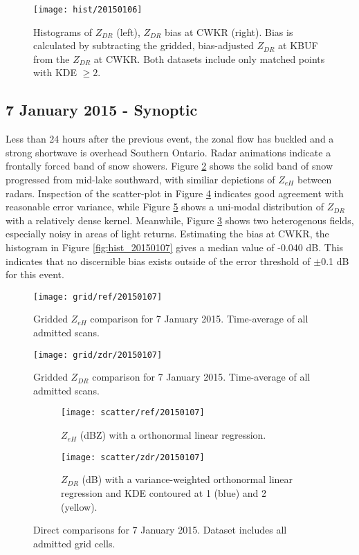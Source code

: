 \begin{figure}[H]
\texttt{[image: hist/20150106]}\centering
\caption{Histograms of $Z_{DR}$ (left), $Z_{DR}$ bias at CWKR (right). Bias is calculated by subtracting the gridded, bias-adjusted $Z_{DR}$ at KBUF from the
$Z_{DR}$ at CWKR. Both datasets include only matched points with KDE $\geq 2$.} 
\label{fig:hist_20150106}
\end{figure}

\subsection{7 January 2015 - Synoptic}
Less than 24 hours after the previous event, the zonal flow has buckled and a strong shortwave is overhead Southern Ontario. Radar animations indicate a
frontally forced band of snow showers. Figure \ref{fig:grid_ref_20150107} shows the solid band of snow progressed from mid-lake southward, with similiar
depictions of $Z_{eH}$ between radars. Inspection of the scatter-plot in Figure \ref{fig:scatter_ref_20150107} indicates good agreement with reasonable error
variance, while Figure \ref{fig:scatter_zdr_20150107} shows a uni-modal distribution of $Z_{DR}$ with a relatively dense kernel.
Meanwhile, Figure \ref{fig:grid_zdr_20150107} shows two heterogenous fields, especially noisy in areas of light returns. 
Estimating the bias at CWKR, the histogram in Figure \ref{fig:hist_20150107} gives a median value of -0.040 dB. This indicates that no discernible bias
exists outside of the error threshold of $\pm$0.1 dB for this event.

\begin{figure}[H]
\texttt{[image: grid/ref/20150107]}
\caption{Gridded $Z_{eH}$ comparison for 7 January 2015. Time-average of all admitted scans.} 
\label{fig:grid_ref_20150107}
\end{figure}

\begin{figure}[H]
\texttt{[image: grid/zdr/20150107]}
\caption{Gridded $Z_{DR}$ comparison for 7 January 2015. Time-average of all admitted scans.} 
\label{fig:grid_zdr_20150107}
\end{figure}
\begin{figure}[H]
\centering
   \begin{subfigure}[t]{0.48\linewidth} \centering
     \texttt{[image: scatter/ref/20150107]}
     \caption{$Z_{eH}$ (dBZ) with a orthonormal linear regression.}\label{fig:scatter_ref_20150107}
   \end{subfigure}
   \begin{subfigure}[t]{0.48\linewidth} \centering
     \texttt{[image: scatter/zdr/20150107]}
     \caption{$Z_{DR}$ (dB) with a variance-weighted orthonormal linear regression and KDE contoured at 1 (blue) and 2 (yellow).}\label{fig:scatter_zdr_20150107}
   \end{subfigure}
\caption{Direct comparisons for 7 January 2015. Dataset includes all admitted grid cells.} \label{fig:scatter_20150107}
\end{figure}

